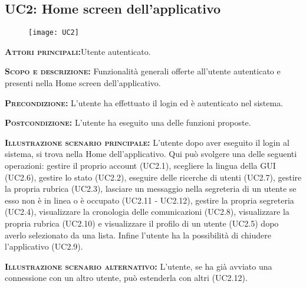 \subsection{UC2: Home screen dell'applicativo}
\begin{figure}[H]
\begin{center}
\texttt{[image: UC2]}
\caption{}\label{fig:}
\end{center}
\end{figure}
\begin{description}
\item{\scshape\bfseries Attori principali:}Utente autenticato.
\item{\scshape\bfseries Scopo e descrizione:} Funzionalità generali offerte all'utente autenticato e presenti nella Home screen dell'applicativo.
\item{\scshape\bfseries Precondizione:} L'utente ha effettuato il login ed è autenticato nel sistema.
\item{\scshape\bfseries Postcondizione:} L'utente ha eseguito una delle funzioni proposte.
\item{\scshape\bfseries Illustrazione scenario principale:} L'utente dopo aver eseguito il login al sistema, si trova nella Home dell'applicativo. Qui può svolgere una delle seguenti operazioni: gestire il proprio account (UC2.1), scegliere la lingua della GUI (UC2.6), gestire lo stato (UC2.2), eseguire delle ricerche di utenti (UC2.7), gestire la propria rubrica (UC2.3), lasciare un messaggio nella segreteria di un utente se esso non è in linea o è occupato (UC2.11 - UC2.12), gestire la propria segreteria (UC2.4), visualizzare la cronologia delle comunicazioni (UC2.8), visualizzare la propria rubrica (UC2.10) e visualizzare il profilo di un utente (UC2.5) dopo averlo selezionato da una lista. Infine l'utente ha la possibilità di chiudere l'applicativo (UC2.9).
\item{\scshape\bfseries Illustrazione scenario alternativo:} L'utente, se ha già avviato una connessione con un altro utente, può estenderla con altri (UC2.12).
\end{description}

